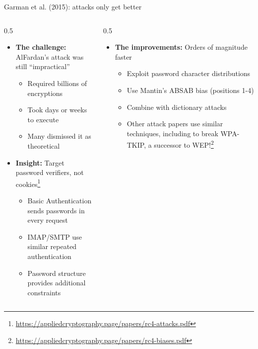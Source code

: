 \documentclass[aspectratio=169, lualatex, handout]{beamer}
\begin{document}
\begin{frame}{Garman et al. (2015): attacks only get better}
	\begin{columns}[c]
		\begin{column}{0.5\textwidth}
			\begin{itemize}[<+->]
				\item \textbf{The challenge:} AlFardan's attack was still ``impractical''
				      \begin{itemize}[<+->]
					      \item Required billions of encryptions
					      \item Took days or weeks to execute
					      \item Many dismissed it as theoretical
				      \end{itemize}
				\item \textbf{Insight:} Target password verifiers, not cookies\footnote{\url{https://appliedcryptography.page/papers/rc4-attacks.pdf}}
				      \begin{itemize}[<+->]
					      \item Basic Authentication sends passwords in every request
					      \item IMAP/SMTP use similar repeated authentication
					      \item Password structure provides additional constraints
				      \end{itemize}
			\end{itemize}
		\end{column}
		\begin{column}{0.5\textwidth}
			\begin{itemize}[<+->]
				\item \textbf{The improvements:} Orders of magnitude faster
				      \begin{itemize}[<+->]
					      \item Exploit password character distributions
					      \item Use Mantin's ABSAB bias (positions 1-4)
					      \item Combine with dictionary attacks
					      \item Other attack papers use similar techniques, including to break WPA-TKIP, a successor to WEP!\footnote{\url{https://appliedcryptography.page/papers/rc4-biases.pdf}}
				      \end{itemize}
			\end{itemize}
		\end{column}
	\end{columns}
\end{frame}
\end{document}
